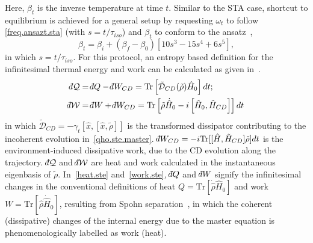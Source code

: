 \documentclass[aps,pra,twocolumn,showpacs,showkeys,groupedaddress,nobalancelastpage,nofootinbib,floatfix,superscriptaddress,longbibliography]{revtex4-2}
\begin{document}
Here, $\beta_t$ is the inverse temperature at time $t$. Similar to the STA case, shortcut to equilibrium is achieved for a general setup by requesting $\omega_t$ to follow \cref{freq.ansazt.sta} (with $s=t/\tau_{iso}$) and $\beta_t$ to conform to the ansatz~\cite{Alipour2020shortcutsto},
\begin{equation}\label{beta.ansazt.ste}
   \beta_t = \beta_i + (\beta_f - \beta_0)[10s^3-15s^4+6s^5],
\end{equation}
in which $s=t/\tau_{iso}$. For this protocol, an entropy based definition for the infinitesimal thermal energy and work can be calculated as given in~\cite{PhysRevA.105.L040201}.
\begin{align}
    \dbar\mathcal{Q} &= \dbar Q - \dbar W_{CD} = \text{Tr}\left[\tilde{\mathcal{D}}_{CD}(\tilde{\rho}) \hat{H}_0 \right]dt;\label{heat.ste}\\
    \dbar\mathcal{W} &= \dbar W + \dbar W_{CD} = \text{Tr}\left[\tilde{\rho}\dot{\hat{H}}_0-i\left[\hat{H}_0,\tilde{H}_{CD} \right] \right]dt\label{work.ste}
\end{align}
in which $\tilde{\mathcal{D}}_{CD}=- \gamma_t \left[\hat{x}, \left[\hat{x}, \tilde{\rho}\right]\right]$ is the transformed dissipator contributing to the incoherent evolution in~\cref{qho.ste.master}. $\dbar W_{CD}=-i\text{Tr}[[\hat{H},\tilde{H}_{CD}] \tilde{\rho}]dt$ is the environment-induced dissipative work, due to the CD evolution along the trajectory. $\dbar\mathcal{Q}$ and $\dbar\mathcal{W}$ are heat and work calculated in the instantaneous eigenbasis of $\tilde{\rho}$. In~\cref{heat.ste} and~\cref{work.ste}, $\dbar Q$ and $\dbar W$ signify the infinitesimal changes in the conventional definitions of heat $Q=\text{Tr}[\dot{\hat{\rho}}\hat{H}_0]$ and work $W=\text{Tr}[\hat{\rho}\dot{\hat{H}}_0]$, resulting from Spohn separation~\cite{10.1063/1.523789}, in which the coherent (dissipative) changes of the internal energy due to the master equation is phenomenologically labelled as work (heat).\\
\end{document}
